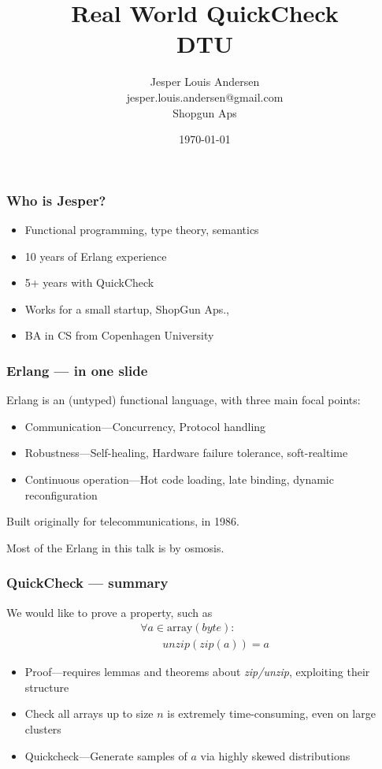 \documentclass[lualatex]{beamer}
\author{Jesper Louis Andersen\\jesper.louis.andersen@gmail.com\\Shopgun Aps}
\date{\today{}}
\title{Real World QuickCheck\\DTU}
\begin{document}
\maketitle

\begin{frame}
\frametitle{Who is Jesper?}
\begin{itemize}
\item Functional programming, type theory, semantics
\item 10 years of Erlang experience
\item 5+ years with QuickCheck
\item Works for a small startup, ShopGun Aps.,
\item BA in CS from Copenhagen University
\end{itemize}
\end{frame}

\begin{frame}
\frametitle{Erlang — in one slide}
Erlang is an (untyped) functional language, with three main focal points:
\begin{itemize}
\item Communication—Concurrency, Protocol handling
\item Robustness—Self-healing, Hardware failure tolerance, soft-realtime
\item Continuous operation—Hot code loading, late binding, dynamic reconfiguration
\end{itemize}

Built originally for telecommunications, in 1986.

Most of the Erlang in this talk is by osmosis.
\end{frame}

\begin{frame}[fragile]
\frametitle{QuickCheck — summary}
We would like to prove a property, such as
\begin{equation}
\begin{split}
	\forall a \in \text{array}(byte) :\\
	\quad \quad unzip(zip(a)) = a
\end{split}
\end{equation}
\begin{itemize}
\item Proof—requires lemmas and theorems about \emph{zip/unzip}, exploiting their structure
\item Check all arrays up to size $n$ is extremely time-consuming, even on large clusters
\item Quickcheck—Generate samples of $a$ via highly skewed distributions
\end{itemize}
\end{frame}
\end{document}
